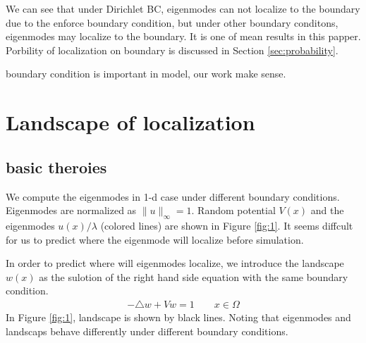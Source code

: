 \documentclass[12pt,a4paper]{article}
\begin{document}
We can see that under Dirichlet BC, eigenmodes can not localize to the boundary due to the enforce boundary condition, but under other boundary conditons, eigenmodes may localize to the boundary. It is one of mean results in this papper. Porbility of localization on boundary is discussed in Section \ref{sec:probability}.

{\color{gray} boundary condition is important in model, our work make sense.}

\section{Landscape of localization}\label{sec:landscape}

\subsection{basic theroies}

We compute the eigenmodes in 1-d case under different boundary conditions. Eigenmodes are normalized as $\|u\|_{\infty} = 1$. Random potential $V(x)$ and the eigenmodes $u(x) / \lambda$ (colored lines) are shown in Figure \ref{fig:1}. It seems diffcult for us to predict where the eigenmode will localize before simulation.

In order to predict where will eigenmodes localize, we introduce the landscape $w(x)$ as the sulotion of the right hand side equation with the same boundary condition.
\begin{align}\label{eq:landscape}
- \triangle w + V w  = 1 \qquad x \in \Omega
\end{align}
In Figure \ref{fig:1}, landscape is shown by black lines. Noting that eigenmodes and landscaps behave differently under different boundary conditions.
\end{document}
